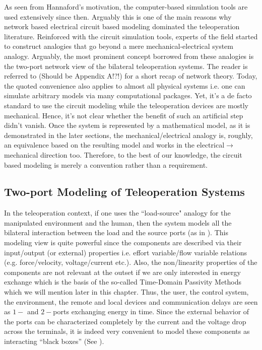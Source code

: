As seen from Hannaford's motivation, the computer-based simulation tools are used extensively since then. Arguably
this is one of the main reasons why network based electrical circuit based modeling dominated the teleoperation literature. 
Reinforced with the circuit simulation tools, experts of the field started to construct analogies that go beyond
a mere mechanical-electrical system analogy. Arguably, the most prominent concept borrowed from these analogies is the two-port network 
view of the bilateral teleoperation systems. The reader is referred to  (Should be Appendix A!?!) for a short recap of network theory. %
Today, the quoted convenience also applies to almost all physical systems i.e. one can simulate arbitrary models via many 
computational packages. Yet, it's a de facto standard to use the circuit modeling while the teleoperation devices are mostly 
mechanical. Hence, it's not clear whether the benefit of such an artificial step didn't vanish. Once the system is represented 
by a mathematical model, as it is demonstrated in the later sections, the mechanical/electrical analogy is, roughly, an equivalence
based on the resulting model and works in the electrical$\to$mechanical direction too. Therefore, to the best of our knowledge, the 
circuit based modeling is merely a convention rather than a requirement.

\subsection{Two-port Modeling of Teleoperation Systems}

In the teleoperation context, if one uses the ``load-source" analogy for the manipulated environment 
and the human, then the system models all the bilateral interaction between the load and the source 
ports (as in ). This modeling view is quite powerful since the components are described via their input/output 
(or external) properties i.e. effort variable/flow variable relations (e.g. force/velocity, voltage/current etc.). Also, the non/linearity
properties of the components are not relevant at the outset if we are only interested in energy exchange which is the basis
of the so-called Time-Domain Passivity Methods \cite{hannafordryu} which we will mention later in this chapter. Thus, 
the user, the control system, the environment, the remote and local devices and communication delays are seen as 
$1-$ and $2-$ports exchanging energy in time. Since the external behavior of the ports can be characterized completely by the 
current and the voltage drop across the terminals, it is indeed very convenient to model these components as 
interacting ``black boxes'' (See ).


